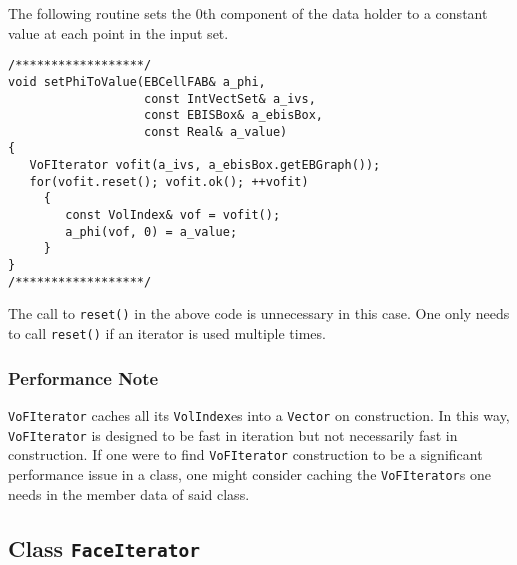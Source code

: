 The following routine sets the 0th component of the
data holder to a constant value at each point in
the input set.
\begin{small}
\begin{verbatim}
/******************/
void setPhiToValue(EBCellFAB& a_phi,
                   const IntVectSet& a_ivs,
                   const EBISBox& a_ebisBox,
                   const Real& a_value)
{
   VoFIterator vofit(a_ivs, a_ebisBox.getEBGraph());
   for(vofit.reset(); vofit.ok(); ++vofit)
     {
        const VolIndex& vof = vofit();
        a_phi(vof, 0) = a_value;
     }
}
/******************/
\end{verbatim}
\end{small}
The call to {\tt reset()} in the above code
is unnecessary in this case.  One only needs
to call {\tt reset()} if an iterator is 
used multiple times.

\subsubsection{Performance Note}
{\tt VoFIterator} caches all its {\tt VolIndex}es
into a {\tt Vector} on construction.  In this 
way, {\tt VoFIterator} is
designed to be fast in  iteration but not
necessarily fast in construction.  If one
were to find {\tt VoFIterator} construction
to be a significant performance issue
in a class, one might consider caching the {\tt VoFIterator}s
one needs in the member data of said class.



\subsection{Class {\tt FaceIterator}}


